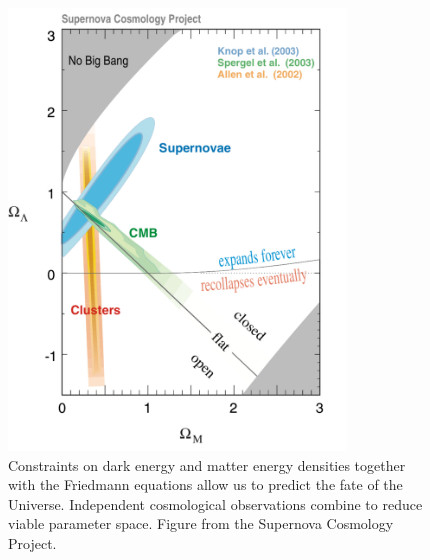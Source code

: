 \documentclass[a4paper,12pt]{article}
\theoremstyle{remark}
\renewcommand{\=}[1]{\stackrel{#1}{=}} %
\theoremstyle{plain}
\theoremstyle{definition}
\begin{document}
\begin{figure}[t]
\begin{center}
    \includegraphics*[angle=0,width=0.8\textwidth]{img/fate.png}
    \caption[Fate of the Universe.]{Constraints on dark energy and matter energy densities together with the Friedmann equations allow us to predict the fate of the Universe. Independent cosmological observations combine to reduce viable parameter space. Figure from the Supernova Cosmology Project.}
\label{fig:fate}
\end{center}
\end{figure}


\begingroup

\linespread{0.5}\selectfont

\endgroup
\end{document}
